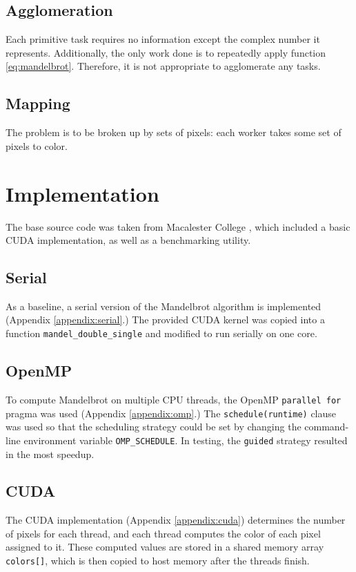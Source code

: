 \documentclass{article}
\begin{document}
    \subsection{Agglomeration}
        Each primitive task requires no information except the complex number it represents. Additionally, the only work done is to repeatedly apply function \ref{eq:mandelbrot}. Therefore, it is not appropriate to agglomerate any tasks.

    \subsection{Mapping}
        The problem is to be broken up by sets of pixels: each worker takes some set of pixels to color.


\section{Implementation} \label{sec:impl}
    The base source code was taken from Macalester College \cite{mandel_orig}, which included a basic CUDA implementation, as well as a benchmarking utility.

    \subsection{Serial}
        As a baseline, a serial version of the Mandelbrot algorithm is implemented (Appendix \ref{appendix:serial}.) The provided CUDA kernel was copied into a function \verb|mandel_double_single| and modified to run serially on one core.

    \subsection{OpenMP}
        To compute Mandelbrot on multiple CPU threads, the OpenMP \verb|parallel for| pragma was used (Appendix \ref{appendix:omp}.) The \verb|schedule(runtime)| clause was used so that the scheduling strategy could be set by changing the command-line environment variable \verb|OMP_SCHEDULE|. In testing, the \verb|guided| strategy resulted in the most speedup.

    \subsection{CUDA}
        The CUDA implementation (Appendix \ref{appendix:cuda}) determines the number of pixels for each thread, and each thread computes the color of each pixel assigned to it. These computed values are stored in a shared memory array \verb|colors[]|, which is then copied to host memory after the threads finish.
\end{document}
